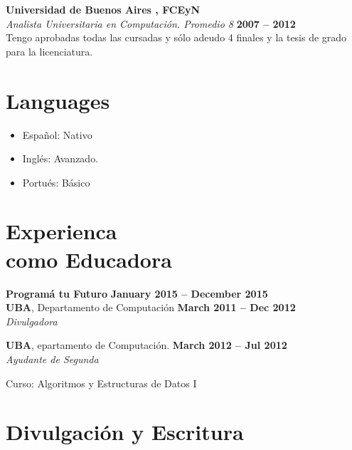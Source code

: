 \documentclass[margin,line]{resume}
\begin{document}
\begin{resume}
\textbf{Universidad de Buenos Aires , FCEyN} \vspace{2mm}\\\vspace{1mm}
\textsl{Analista Universitaria en Computación. Promedio 8} \hfill \textbf{2007 -- 2012}
\\
Tengo aprobadas todas las cursadas y sólo adeudo 4 finales y la tesis de grado para la licenciatura.
\section{\mysidestyle Languages}
\begin{itemize}
\item Español: Nativo
\item Inglés:  Avanzado.
\item Portués: Básico
\end{itemize}



\newpage

\section{\mysidestyle Experienca\\ como Educadora}

\textbf{Program\'a tu Futuro} \hfill \textbf{January 2015 --  December 2015}
\\

\textbf{UBA}, Departamento de Computación \hfill \textbf{March 2011 --  Dec 2012}
\\
\textsl{Divulgadora} \hfill 

\textbf{UBA}, epartamento de Computación. \hfill \textbf{March 2012 --  Jul 2012}
\\
\textsl{Ayudante de Segunda} \hfill
\begin{list2}
	\item Curso: Algoritmos y Estructuras de Datos I
\end{list2}\vspace{-1.5mm}

\vspace{2mm}



\section{\mysidestyle Divulgación y Escritura}



\end{resume}
\end{document}
